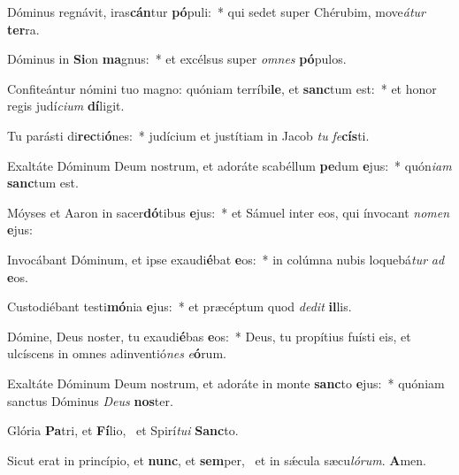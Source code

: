 \item Dóminus regnávit, iras\textbf{cán}tur \textbf{pó}puli:~* qui sedet super Chérubim, move\textit{á}\textit{tur} \textbf{ter}ra.
\item Dóminus in \textbf{Si}on \textbf{ma}gnus:~* et excélsus super \textit{om}\textit{nes} \textbf{pó}pulos.
\item Confiteántur nómini tuo magno: quóniam terríbi\textbf{le}, et \textbf{sanc}tum est:~* et honor regis judí\textit{ci}\textit{um} \textbf{dí}ligit.
\item Tu parásti di\textbf{rec}ti\textbf{ó}nes:~* judícium et justítiam in Jacob \textit{tu} \textit{fe}\textbf{cís}ti.
\item Exaltáte Dóminum Deum nostrum, et adoráte scabéllum \textbf{pe}dum \textbf{e}jus:~* quón\textit{i}\textit{am} \textbf{sanc}tum est.
\item Móyses et Aaron in sacer\textbf{dó}tibus \textbf{e}jus:~* et Sámuel inter eos, qui ínvocant \textit{no}\textit{men} \textbf{e}jus:
\item Invocábant Dóminum, et ipse exaudi\textbf{é}bat \textbf{e}os:~* in colúmna nubis loquebá\textit{tur} \textit{ad} \textbf{e}os.
\item Custodiébant testi\textbf{mó}nia \textbf{e}jus:~* et præcéptum quod \textit{de}\textit{dit} \textbf{il}lis.
\item Dómine, Deus noster, tu exaudi\textbf{é}bas \textbf{e}os:~* Deus, tu propítius fuísti eis, et ulcíscens in omnes adinventió\textit{nes} \textit{e}\textbf{ó}rum.
\item Exaltáte Dóminum Deum nostrum, et adoráte in monte \textbf{sanc}to \textbf{e}jus:~* quóniam sanctus Dóminus \textit{De}\textit{us} \textbf{nos}ter.
\item Glória \textbf{Pa}tri, et \textbf{Fí}lio,~\psstar{} et Spirí\textit{tu}\textit{i} \textbf{Sanc}to.
\item Sicut erat in princípio, et \textbf{nunc}, et \textbf{sem}per,~\psstar{} et in sǽcula sæcu\textit{ló}\textit{rum}. \textbf{A}men.